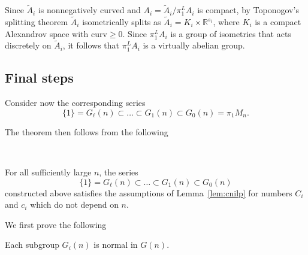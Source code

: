 \documentclass{amsart}
\begin{document}
Since $\tilde A_i$ is nonnegatively curved
and $A_i=\tilde A_i/\pi_1^LA_i$ is compact,
by Toponogov's splitting theorem
$\tilde A_i$ isometrically splits
as $\tilde A_i=K_i\times \mathbb{R}^{s_i}$,
where $K_i$ is a compact Alexandrov space with curv$\ge 0$.
Since $\pi_1^LA_i$ is a group of isometries
that acts %
discretely on $\tilde A_i$,
it follows that $\pi_1^LA_i$ is a virtually abelian group.

\subsection{Final steps}

Consider now the corresponding series
$$\{1\}=G_\ell(n)\subset\ldots\subset G_1(n)\subset G_0(n)=\pi_1M_n.$$

The theorem then follows from the following

\

\begin{lem}\label{l:claim}
For all sufficiently large $n$, the series
$$\{1\}=G_\ell(n)\subset\ldots\subset G_1(n)\subset G_0(n)$$
constructed above
satisfies the assumptions of Lemma~\ref{lem:cnilp}
for numbers $C_i$ and $c_i$ which do not depend on $n$.
\end{lem}

We first prove the following
\begin{slem}\label{lem:normal}
 Each subgroup $G_i(n)$ is normal in $G(n)$.
\end{slem}
\end{document}
